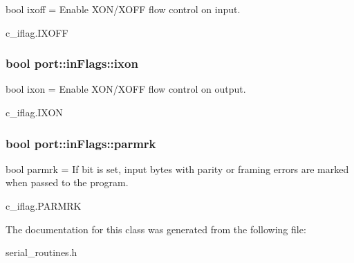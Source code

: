 bool ixoff = Enable X\+O\+N/\+X\+O\+FF flow control on input. 

c\+\_\+iflag.\+I\+X\+O\+FF
\subsubsection[{\texorpdfstring{ixon}{ixon}}]{\setlength{\rightskip}{0pt plus 5cm}bool port\+::in\+Flags\+::ixon}\hypertarget{classport_1_1inFlags_a721d59e230e1d380883557baca1af9dc}{}\label{classport_1_1inFlags_a721d59e230e1d380883557baca1af9dc}


bool ixon = Enable X\+O\+N/\+X\+O\+FF flow control on output. 

c\+\_\+iflag.\+I\+X\+ON
\subsubsection[{\texorpdfstring{parmrk}{parmrk}}]{\setlength{\rightskip}{0pt plus 5cm}bool port\+::in\+Flags\+::parmrk}\hypertarget{classport_1_1inFlags_a7d187e7323766b568aef6093e7b36a4e}{}\label{classport_1_1inFlags_a7d187e7323766b568aef6093e7b36a4e}


bool parmrk = If bit is set, input bytes with parity or framing errors are marked when passed to the program. 

c\+\_\+iflag.\+P\+A\+R\+M\+RK

The documentation for this class was generated from the following file\+:\begin{DoxyCompactItemize}
\item 
serial\+\_\+routines.\+h\end{DoxyCompactItemize}

